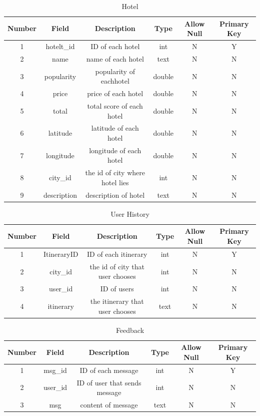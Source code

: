 \documentclass[10pt]{article}
\begin{document}
\begin{table}[htb]
	\centering

	\begin{tabular}{c|c|c|c|c|c}
		\hline
		Number&Field&Description&Type&Allow Null&Primary Key\\
		\hline
		1&hotelt\_id&ID of each hotel&int&N&Y\\
		\hline
		2&name&name of each hotel&text&N&N\\
		\hline
		3&popularity&popularity of eachhotel&double&N&N\\
		\hline
		4&price&price of each hotel&double&N&N\\
		\hline
		5&total&total score of each hotel&double&N&N\\
		\hline
		6&latitude&latitude of each hotel&double&N&N\\
		\hline
		7&longitude&longitude of each hotel&double&N&N\\
		\hline
		8&city\_id&the id of city where hotel lies&int&N&N\\
		\hline
		9&description&description of hotel&text&N&N\\
		\hline
   \end{tabular}
	\caption{Hotel}
\end{table}

\begin{table}[htb]
	\centering

	\begin{tabular}{c|c|c|c|c|c}
		\hline
		Number&Field&Description&Type&Allow Null&Primary Key\\
		\hline
		1&ItineraryID&ID of each itinerary&int&N&Y\\
		\hline
		2&city\_id&the id of city that user chooses&int&N&N\\
		\hline
		3&user\_id&ID of users&int&N&N\\
		\hline
		4&itinerary&the itinerary that user chooses&text&N&N\\
		\hline
   \end{tabular}
	\caption{User History}
\end{table}

\newpage

\begin{table}[htb]
	\centering

	\begin{tabular}{c|c|c|c|c|c}
		\hline
		Number&Field&Description&Type&Allow Null&Primary Key\\
		\hline
		1&msg\_id&ID of each message&int&N&Y\\
		\hline
		2&user\_id&ID of user that sends message&int&N&N\\
		\hline
		3&msg&content of message&text&N&N\\
		\hline
   \end{tabular}
	\caption{Feedback}
\end{table}
\end{document}
